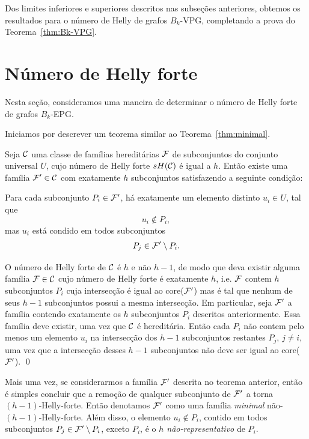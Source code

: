 Dos limites inferiores e superiores descritos nas subseções anteriores, obtemos os resultados para o  número de Helly de grafos $B_k$-VPG, completando a prova do Teorema~\ref{thm:Bk-VPG}.

\section{Número de Helly forte}\label{sec:helly-forte}

Nesta seção, consideramos uma maneira de determinar o número de Helly forte de grafos  $B_k$-EPG.

Iniciamos por descrever um teorema similar ao Teorema~\ref{thm:minimal}.

\begin{theorem}\label{thm:minimal-strong}

Seja ${\cal C}$ uma classe de famílias hereditárias  $\cal F$ de subconjuntos do conjunto universal $U$, cujo número de Helly forte  $sH({\cal C})$ é igual a $h$. Então existe uma família ${\cal F'} \in {\cal C}$ com exatamente $h$ subconjuntos satisfazendo a seguinte condição: 

Para cada subconjunto $P_i \in \cal {F'}$, há exatamente um elemento distinto $u_i \in U$, tal que 
$$u_i \not \in P_i,$$ 
mas $u_i$ está condido em todos subconjuntos 
$$P_j \in {\cal F'} \setminus P_i.$$
\end{theorem}

\proof O número de Helly forte  de ${\cal C}$ é $h$ e não $h - 1$, de modo que deva existir alguma família ${\cal F} \in {\cal C}$ cujo  número de Helly forte  é exatamente $h$, i.e. $\cal F$  contem $h$ subconjuntos $P_i$ cuja intersecção é igual ao core($\cal F'$) mas é tal que nenhum de seus  $h-1$ subconjuntos possui a mesma intersecção. Em particular, seja $\cal F'$ a família contendo exatamente os  $h$ subconjuntos $P_i$ descritos anteriormente. Essa  família deve existir, uma vez que $\cal C$ é hereditária. Então cada  $P_i$ não contem pelo menos um elemento $u_i$ na intersecção dos  $h-1$ subconjuntos restantes $P_j$, $j \ne i$, 
uma vez que a intersecção desses $h-1$ subconjuntos não deve ser igual ao core($\cal F'$).  \qed

Mais uma vez, se considerarmos a  família $\cal F'$ descrita no teorema anterior, então é simples concluir que a remoção de qualquer subconjunto de $\cal {F'}$ a torna $(h-1)$-Helly-forte.  Então denotamos $\cal {F'}$ como uma família {\it minimal} não-$(h-1)$-Helly-forte. Além disso, o elemento $u_i \not \in P_i$, contido em todos subconjuntos $P_j \in {\cal{F'}} \setminus P_i$, exceto $P_i$, é o {\it $h$ não-representativo} de $P_i$.  

